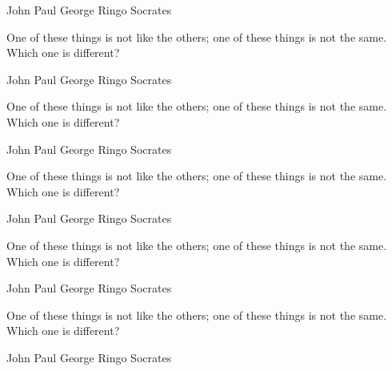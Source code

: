 \documentclass[a4paper,answers,addpoints]{exam}
\begin{document}
\begin{questions}
\begin{randomizechoices}
\choice John
\choice Paul
\choice George
\choice Ringo
\CorrectChoice Socrates
\end{randomizechoices}

\question[5]
One of these things is not like the others; one of these
things is not the same. Which one is different?

\begin{randomizechoices}
\choice John
\choice Paul
\choice George
\choice Ringo
\CorrectChoice Socrates
\end{randomizechoices}

\question[5]
One of these things is not like the others; one of these
things is not the same. Which one is different?

\begin{choices}
\choice John
\choice Paul
\choice George
\choice Ringo
\CorrectChoice Socrates
\end{choices}

\question[5]
One of these things is not like the others; one of these
things is not the same. Which one is different?

\begin{randomizeoneparchoices}
\choice John
\choice Paul
\choice George
\choice Ringo
\CorrectChoice Socrates
\end{randomizeoneparchoices}

\question[5]
One of these things is not like the others; one of these
things is not the same. Which one is different?

\begin{oneparchoices}
\choice John
\choice Paul
\choice George
\choice Ringo
\CorrectChoice Socrates
\end{oneparchoices}

\question[5]
One of these things is not like the others; one of these
things is not the same. Which one is different?

\begin{randomizechoices}
\choice John
\choice Paul
\choice George
\choice Ringo
\CorrectChoice Socrates
\end{randomizechoices}


\end{questions}
\end{document}
